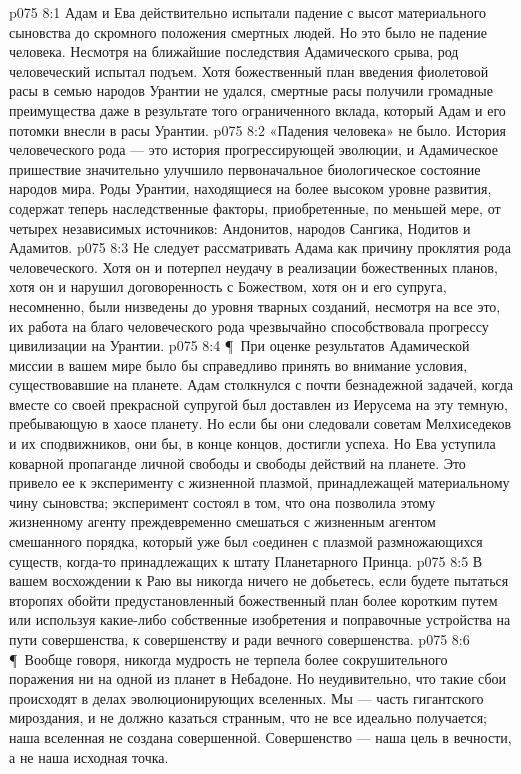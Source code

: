 \vs p075 8:1 Адам и Ева действительно испытали падение с высот материального сыновства до скромного положения смертных людей. Но это было не падение человека. Несмотря на ближайшие последствия Адамического срыва, род человеческий испытал подъем. Хотя божественный план введения фиолетовой расы в семью народов Урантии не удался, смертные расы получили громадные преимущества даже в результате того ограниченного вклада, который Адам и его потомки внесли в расы Урантии.
\vs p075 8:2 «Падения человека» не было. История человеческого рода --- это история прогрессирующей эволюции, и Адамическое пришествие значительно улучшило первоначальное биологическое состояние народов мира. Роды Урантии, находящиеся на более высоком уровне развития, содержат теперь наследственные факторы, приобретенные, по меньшей мере, от четырех независимых источников: Андонитов, народов Сангика, Нодитов и Адамитов.
\vs p075 8:3 Не следует рассматривать Адама как причину проклятия рода человеческого. Хотя он и потерпел неудачу в реализации божественных планов, хотя он и нарушил договоренность с Божеством, хотя он и его супруга, несомненно, были низведены до уровня тварных созданий, несмотря на все это, их работа на благо человеческого рода чрезвычайно способствовала прогрессу цивилизации на Урантии.
\vs p075 8:4 \P\ При оценке результатов Адамической миссии в вашем мире было бы справедливо принять во внимание условия, существовавшие на планете. Адам столкнулся с почти безнадежной задачей, когда вместе со своей прекрасной супругой был доставлен из Иерусема на эту темную, пребывающую в хаосе планету. Но если бы они следовали советам Мелхиседеков и их сподвижников,  они бы, в конце концов, достигли успеха. Но Ева уступила коварной пропаганде личной свободы и свободы действий на планете. Это привело ее к эксперименту с жизненной плазмой, принадлежащей материальному чину сыновства; эксперимент состоял в том, что она позволила этому жизненному агенту преждевременно смешаться с жизненным агентом смешанного порядка, который уже был cоединен с плазмой размножающихся существ, когда\hyp{}то принадлежащих к штату Планетарного Принца.
\vs p075 8:5 В вашем восхождении к Раю вы никогда ничего не добьетесь, если будете пытаться второпях обойти предустановленный божественный план более коротким путем или используя какие\hyp{}либо собственные изобретения и поправочные устройства на пути совершенства, к совершенству и ради вечного совершенства.
\vs p075 8:6 \P\ Вообще говоря, никогда мудрость не терпела более сокрушительного поражения ни на одной из планет в Небадоне. Но неудивительно, что такие сбои происходят в делах эволюционирующих вселенных. Мы --- часть гигантского мироздания, и не должно казаться странным, что не все идеально получается; наша вселенная не создана совершенной. Совершенство --- наша цель в вечности, а не наша исходная точка.
